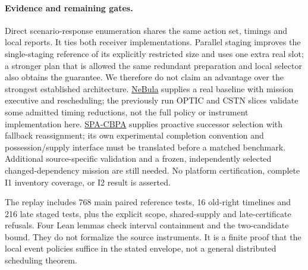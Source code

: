\documentclass{article}
\begin{document}
\paragraph{Evidence and remaining gates.}
Direct scenario-response enumeration shares the same action set, timings and local reports. It ties both receiver implementations. Parallel staging improves the single-staging reference of its explicitly restricted size and uses one extra real slot; a stronger plan that is allowed the same redundant preparation and local selector also obtains the guarantee. We therefore do not claim an advantage over the strongest established architecture. \href{https://arxiv.org/html/2103.11470}{NeBula} supplies a real baseline with mission executive and rescheduling; the previously run OPTIC and CSTN slices validate some admitted timing reductions, not the full policy or instrument implementation here. \href{https://openrepository.aut.ac.nz/items/9104ed9b-63a5-4975-8063-9034ed8efa12/full}{SPA-CBPA} supplies proactive successor selection with fallback reassignment; its own experimental completion convention and possession/supply interface must be translated before a matched benchmark. Additional source-specific validation and a frozen, independently selected changed-dependency mission are still needed. No platform certification, complete I1 inventory coverage, or I2 result is asserted.

The replay includes 768 main paired reference tests, 16 old-right timelines and 216 late staged tests, plus the explicit scope, shared-supply and late-certificate refusals. Four Lean lemmas check interval containment and the two-candidate bound. They do not formalize the source instruments. It is a finite proof that the local event policies suffice in the stated envelope, not a general distributed scheduling theorem.
\end{document}
